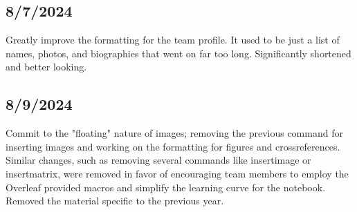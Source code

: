 \subsection{8/7/2024}
Greatly improve the formatting for the team profile. It used to be just a list of
names, photos, and biographies that went on far too long. Significantly shortened
and better looking.
\subsection{8/9/2024}
Commit to the "floating" nature of images; removing the previous command for inserting
images and working on the formatting for figures and crossreferences. Similar changes,
such as removing several commands like insertimage or insertmatrix, were removed in favor
of encouraging team members to employ the Overleaf provided macros and simplify the
learning curve for the notebook. Removed the material specific to the previous year.
